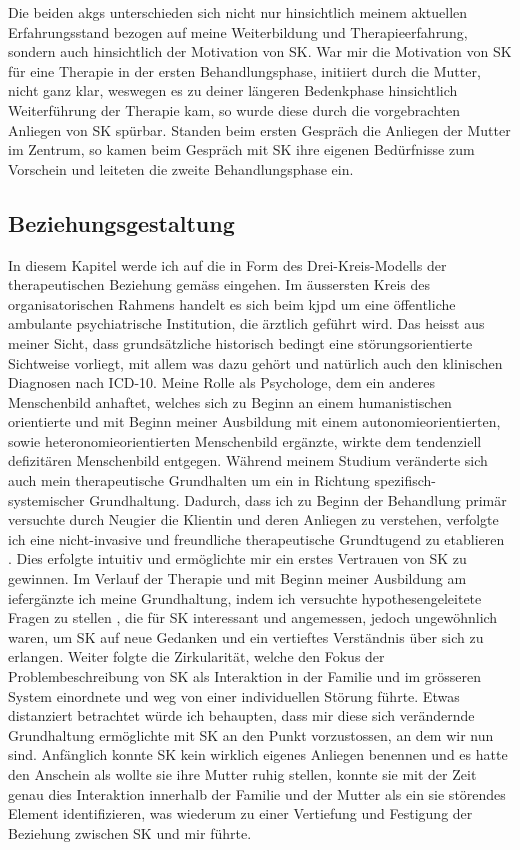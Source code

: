 Die beiden \acp{akg} unterschieden sich nicht nur hinsichtlich meinem aktuellen Erfahrungsstand bezogen auf meine Weiterbildung und Therapieerfahrung, sondern auch hinsichtlich der Motivation von SK. War mir die Motivation von SK für eine Therapie in der ersten Behandlungsphase, initiiert durch die Mutter, nicht ganz klar, weswegen es zu deiner längeren Bedenkphase hinsichtlich Weiterführung der Therapie kam, so wurde diese durch die vorgebrachten Anliegen von SK spürbar. Standen beim ersten Gespräch die Anliegen der Mutter im Zentrum, so kamen beim Gespräch mit SK ihre eigenen Bedürfnisse zum Vorschein und leiteten die zweite Behandlungsphase ein. 


\subsection{Beziehungsgestaltung} \label{lbBeziehungsgestaltung}  
In diesem Kapitel werde ich auf die  in Form des Drei-Kreis-Modells der therapeutischen Beziehung gemäss  eingehen. Im äussersten Kreis des organisatorischen Rahmens handelt es sich beim \ac{kjpd} um eine öffentliche ambulante psychiatrische Institution, die ärztlich geführt wird. Das heisst aus meiner Sicht, dass grundsätzliche historisch bedingt eine störungsorientierte Sichtweise vorliegt, mit allem was dazu gehört und natürlich auch den klinischen Diagnosen nach ICD-10. Meine Rolle als Psychologe, dem ein anderes Menschenbild anhaftet, welches sich zu Beginn an einem humanistischen orientierte und mit Beginn meiner Ausbildung mit einem autonomieorientierten, sowie heteronomieorientierten Menschenbild ergänzte, wirkte dem tendenziell defizitären Menschenbild entgegen. Während meinem Studium veränderte sich auch mein therapeutische Grundhalten um ein in Richtung spezifisch-systemischer Grundhaltung. Dadurch, dass ich zu Beginn der Behandlung primär versuchte durch Neugier die Klientin und deren Anliegen zu verstehen, verfolgte ich eine nicht-invasive und freundliche therapeutische Grundtugend zu etablieren \cite{Cecchin1988}. Dies erfolgte intuitiv und ermöglichte mir ein erstes Vertrauen von SK zu gewinnen. Im Verlauf der Therapie und mit Beginn meiner Ausbildung am \ac{ief}ergänzte ich meine Grundhaltung, indem ich versuchte hypothesengeleitete Fragen zu stellen \cite{Andersen1990}, die für SK interessant und angemessen, jedoch ungewöhnlich waren, um SK auf neue Gedanken und ein vertieftes Verständnis über sich zu erlangen. Weiter folgte die Zirkularität, welche den Fokus der Problembeschreibung von SK als Interaktion in der Familie und im grösseren System einordnete und weg von einer individuellen Störung führte. Etwas distanziert betrachtet würde ich behaupten, dass mir diese sich verändernde Grundhaltung ermöglichte mit SK an den Punkt vorzustossen, an dem wir nun sind. Anfänglich konnte SK kein wirklich eigenes Anliegen benennen und es hatte den Anschein als wollte sie ihre Mutter ruhig stellen, konnte sie mit der Zeit genau dies Interaktion innerhalb der Familie und der Mutter als ein sie störendes Element identifizieren, was wiederum zu einer Vertiefung und Festigung der Beziehung zwischen SK und mir führte.



